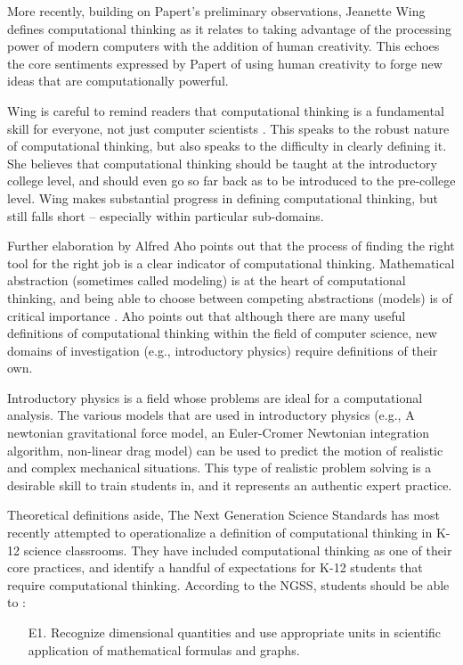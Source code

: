 \documentclass{msuphddissertation}
\begin{document}
\begin{doublespace}
More recently, building on Papert's preliminary observations, Jeanette Wing defines computational thinking as it relates to taking advantage of the processing power of modern computers with the addition of human creativity.  This echoes the core sentiments expressed by Papert of using human creativity to forge new ideas that are computationally powerful.

Wing is careful to remind readers that computational thinking is a fundamental skill for everyone, not just computer scientists \cite{Wing2008}.  This speaks to the robust nature of computational thinking, but also speaks to the difficulty in clearly defining it.  She believes that computational thinking should be taught at the introductory college level, and should even go so far back as to be introduced to the pre-college level.  Wing makes substantial progress in defining computational thinking, but still falls short -- especially within particular sub-domains.

Further elaboration by Alfred Aho points out that the process of finding the right tool for the right job is a clear indicator of computational thinking.  Mathematical abstraction (sometimes called modeling) is at the heart of computational thinking, and being able to choose between competing abstractions (models) is of critical importance \cite{Aho2012}.  Aho points out that although there are many useful definitions of computational thinking within the field of computer science, new domains of investigation (e.g., introductory physics) require definitions of their own.

Introductory physics is a field whose problems are ideal for a computational analysis.  The various models that are used in introductory physics (e.g., A newtonian gravitational force model, an Euler-Cromer Newtonian integration algorithm, non-linear drag model) can be used to predict the motion of realistic and complex mechanical situations.  This type of realistic problem solving is a desirable skill to train students in, and it represents an authentic expert practice.

Theoretical definitions aside, The Next Generation Science Standards has most recently attempted to operationalize a definition of computational thinking in K-12 science classrooms.  They have included computational thinking as one of their core practices, and identify a handful of expectations for K-12 students that require computational thinking.  According to the NGSS, students should be able to \cite{NGSS2012}: \begin{enumerate}
\item[E1.] Recognize dimensional quantities and use appropriate units in scientific application of mathematical formulas and graphs.


\end{enumerate}
\end{doublespace}
\end{document}
